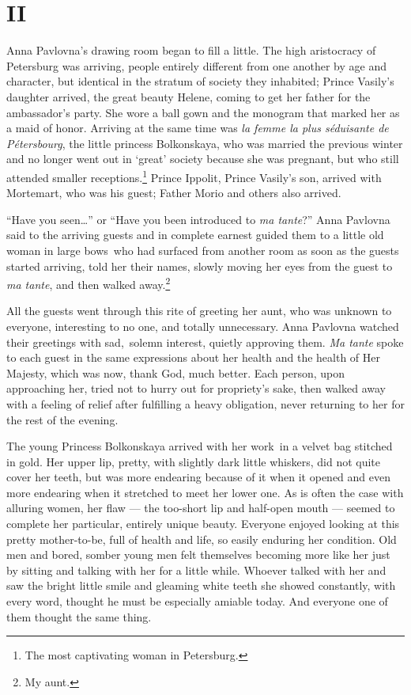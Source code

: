 \section{II} %

Anna Pavlovna's drawing room began to fill a little. The high
aristocracy of Petersburg was arriving, people entirely different from
one another by age and character, but identical in the stratum of
society they inhabited; Prince Vasily's daughter arrived, the great
beauty Helene, coming to get her father for the ambassador's
party. She wore a ball gown and the monogram that marked her as a maid
of honor. Arriving at the same time was \textit{la femme la plus
  s\'eduisante de P\'etersbourg}, the little princess Bolkonskaya, who
was married the previous winter and no longer went out in `great'
society because she was pregnant, but who still attended smaller
receptions.\footnote{The most captivating woman in Petersburg.} Prince
Ippolit, Prince Vasily's son, arrived with Mortemart, who was his
guest; Father Morio and others also arrived.

``Have you seen\ldots'' or ``Have you been introduced to \textit{ma
  tante}?'' Anna Pavlovna said to the arriving guests and in complete
earnest guided them to a little old woman in large bows\ who
had surfaced from another room as soon as the guests started arriving,
told her their names, slowly moving her eyes from the guest to
\textit{ma tante}, and then walked away.\footnote{My aunt.}

All the guests went through this rite of greeting her aunt, who was
unknown to everyone, interesting to no one, and totally
unnecessary. Anna Pavlovna watched their greetings with sad,\
solemn interest, quietly approving them. \textit{Ma tante} spoke to
each guest in the same expressions about her health and the health of
Her Majesty, which was now, thank God, much better. Each person, upon
approaching her, tried not to hurry out for propriety's sake, then
walked away with a feeling of relief after fulfilling a heavy
obligation, never returning to her for the rest of the evening.

The young Princess Bolkonskaya arrived with her work\ in a
velvet bag stitched in gold. Her upper lip, pretty, with slightly dark
little whiskers, did not quite cover her teeth, but was more endearing
because of it when it opened and even more endearing when it stretched
to meet her lower one. As is often the case with alluring women, her
flaw --- the too-short lip and half-open mouth --- seemed to complete
her particular, entirely unique beauty. Everyone enjoyed looking at
this pretty mother-to-be, full of health and life, so easily enduring
her condition. Old men and bored, somber young men felt themselves
becoming more like her just by sitting and talking with her for a
little while. Whoever talked with her and saw the bright little smile
and gleaming white teeth she showed constantly, with every word,
thought he must be especially amiable today. And everyone one of them
thought the same thing.

